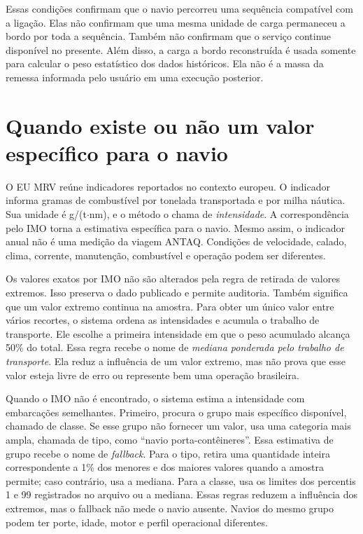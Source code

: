 Essas condições confirmam que o navio percorreu uma sequência compatível com a ligação. Elas não confirmam que uma mesma unidade de carga permaneceu a bordo por toda a sequência. Também não confirmam que o serviço continue disponível no presente. Além disso, a carga a bordo reconstruída é usada somente para calcular o peso estatístico dos dados históricos. Ela não é a massa da remessa informada pelo usuário em uma execução posterior.

\section{Quando existe ou não um valor específico para o navio}
\label{sec:limitacao-intensidade-mrv}

O EU MRV reúne indicadores reportados no contexto europeu. O indicador informa gramas de combustível por tonelada transportada e por milha náutica. Sua unidade é g/(t$\cdot$nm), e o método o chama de \emph{intensidade}. A correspondência pelo IMO torna a estimativa específica para o navio. Mesmo assim, o indicador anual não é uma medição da viagem ANTAQ. Condições de velocidade, calado, clima, corrente, manutenção, combustível e operação podem ser diferentes.

Os valores exatos por IMO não são alterados pela regra de retirada de valores extremos. Isso preserva o dado publicado e permite auditoria. Também significa que um valor extremo continua na amostra. Para obter um único valor entre vários recortes, o sistema ordena as intensidades e acumula o trabalho de transporte. Ele escolhe a primeira intensidade em que o peso acumulado alcança 50\% do total. Essa regra recebe o nome de \emph{mediana ponderada pelo trabalho de transporte}. Ela reduz a influência de um valor extremo, mas não prova que esse valor esteja livre de erro ou represente bem uma operação brasileira.

Quando o IMO não é encontrado, o sistema estima a intensidade com embarcações semelhantes. Primeiro, procura o grupo mais específico disponível, chamado de classe. Se esse grupo não fornecer um valor, usa uma categoria mais ampla, chamada de tipo, como ``navio porta-contêineres''. Essa estimativa de grupo recebe o nome de \emph{fallback}. Para o tipo, retira uma quantidade inteira correspondente a 1\% dos menores e dos maiores valores quando a amostra permite; caso contrário, usa a mediana. Para a classe, usa os limites dos percentis 1 e 99 registrados no arquivo ou a mediana. Essas regras reduzem a influência dos extremos, mas o fallback não mede o navio ausente. Navios do mesmo grupo podem ter porte, idade, motor e perfil operacional diferentes.

